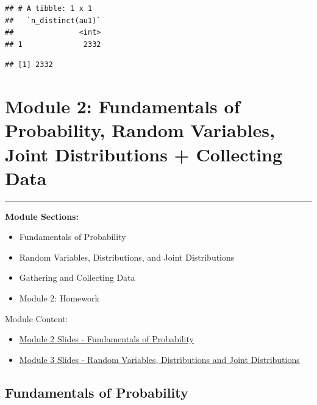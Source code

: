 \documentclass[]{book}
\newenvironment{Shaded}{\begin{snugshade}}{\end{snugshade}}
\newcommand{\KeywordTok}[1]{\textcolor[rgb]{0.13,0.29,0.53}{\textbf{#1}}}
\newcommand{\CommentTok}[1]{\textcolor[rgb]{0.56,0.35,0.01}{\textit{#1}}}
\newcommand{\OperatorTok}[1]{\textcolor[rgb]{0.81,0.36,0.00}{\textbf{#1}}}
\newcommand{\NormalTok}[1]{#1}
\providecommand{\tightlist}{%
  \setlength{\itemsep}{0pt}\setlength{\parskip}{0pt}}
\theoremstyle{definition}
\theoremstyle{definition}
\theoremstyle{definition}
\theoremstyle{remark}
\begin{document}
\begin{verbatim}
## # A tibble: 1 x 1
##   `n_distinct(au1)`
##               <int>
## 1              2332
\end{verbatim}

\begin{Shaded}
\end{Shaded}

\begin{verbatim}
## [1] 2332
\end{verbatim}

\chapter{Module 2: Fundamentals of Probability, Random Variables, Joint
Distributions + Collecting
Data}\label{module-2-fundamentals-of-probability-random-variables-joint-distributions-collecting-data}

\begin{center}\rule{0.5\linewidth}{\linethickness}\end{center}

\textbf{Module Sections:}

\begin{itemize}
\tightlist
\item
  Fundamentals of Probability
\item
  Random Variables, Distributions, and Joint Distributions
\item
  Gathering and Collecting Data
\item
  Module 2: Homework
\end{itemize}

Module Content:

\begin{itemize}
\tightlist
\item
  \href{./files/M1/Lecture_Slides_02.pdf}{Module 2 Slides - Fundamentals
  of Probability}
\item
  \href{./files/M1/Lecture_Slides_03.pdf}{Module 3 Slides - Random
  Variables, Distributions and Joint Distributions}
\end{itemize}

\section{Fundamentals of Probability}\label{fundamentals-of-probability}
\end{document}
